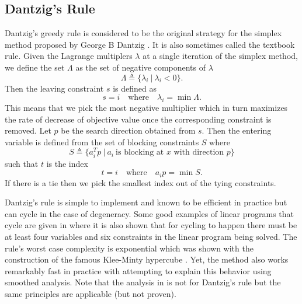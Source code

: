 \documentclass{standalone}
\begin{document}
\subsection{Dantzig's Rule}
\label{sec:pivot:dantzig}
{
  Dantzig's greedy rule is considered to be the original strategy for the simplex method proposed by George B Dantzig \cite{dantzig2016linear}. It is also sometimes called the textbook rule. Given the Lagrange multiplers $\lambda$ at a single iteration of the simplex method, we define the set $\Lambda$ as the set of negative components of $\lambda$
  \[
    \Lambda\triangleq\{\lambda_{i}\:|\:\lambda_{i}<0\}.
  \]
  Then the leaving constraint $s$ is defined as
  \[
    s=i\quad\text{where}\quad \lambda_{i}=\min \Lambda.
  \]
  This means that we pick the most negative multiplier which in turn maximizes the rate of decrease of objective value once the corresponding  constraint is removed. Let $p$ be the search direction obtained from $s$. Then the entering variable is defined from the set of blocking constraints $S$ where
  \[
    S\triangleq\{a_{i}^{T}p\:|\:a_{i}\:\text{is blocking at $x$ with direction $p$}\}
  \]
  such that $t$ is the index
  \[
    t=i\quad\text{where}\quad a_{i}p=\min S.
  \]
  If there is a tie then we pick the smallest index out of the tying constraints.\par
  Dantzig's rule is simple to implement and known to be efficient in practice but can cycle in the case of degeneracy. Some good examples of linear programs that cycle are given in \cite{hall2004simplest} where it is also shown that for cycling to happen there must be at least four variables and six constraints in the linear program being solved. The rule's worst case complexity is exponential which was shown with the construction of the famous Klee-Minty hypercube \cite{klee1972good}. Yet, the method also works remarkably fast in practice with \cite{spielman2004smoothed} attempting to explain this behavior using smoothed analysis. Note that the analysis in \cite{spielman2004smoothed} is not for Dantzig's rule but the same principles are applicable (but not proven).
}
\end{document}
